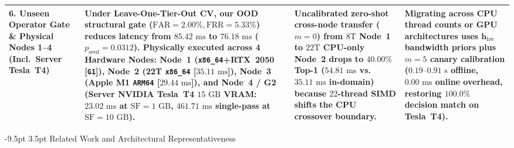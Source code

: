 \documentclass[10pt,a4paper]{article}
\makeatletter
\newenvironment{fitasttable}{%
  \begin{lrbox}{\asttblbox}%
}{%
  \end{lrbox}%
  \sbox{\asttblboxB}{%
    \ifdim\wd\asttblbox>0.96\textwidth
      \resizebox{0.96\textwidth}{!}{\usebox{\asttblbox}}%
    \else
      \usebox{\asttblbox}%
    \fi
  }%
  \ifdim\ht\asttblboxB>0.72\textheight
    \resizebox{!}{0.72\textheight}{\usebox{\asttblboxB}}%
  \else
    \usebox{\asttblboxB}%
  \fi
}
\renewcommand\section{\@startsection{section}{1}{\z@}%
  {-9.5pt \@plus -2pt \@minus -1.5pt}%
  {3.5pt \@plus 1pt}%
  {\normalfont\large\bfseries}}
\makeatother
\begin{document}
\begin{table}[!htbp]
{\begin{fitasttable}
\begin{tabular}{@{}p{2.6cm}p{4.6cm}p{4.3cm}p{4.5cm}@{}}
\textbf{6. Unseen Operator Gate \& Physical Nodes 1--4 (Incl.\ Server Tesla~T4)} & Under Leave-One-Tier-Out CV, our OOD structural gate ($\text{FAR}=2.00\%, \text{FRR}=5.33\%$) reduces latency from $85.42\text{ ms}$ to $76.18\text{ ms}$ ($p_{\text{seed}}=0.0312$). Physically executed across \textbf{4 Hardware Nodes}: Node~1 (\texttt{x86\_64}+RTX~2050 [\texttt{G1}]), Node~2 (22T \texttt{x86\_64} [$35.11\text{ ms}$]), Node~3 (Apple M1 \texttt{ARM64} [$29.44\text{ ms}$]), and \textbf{Node~4 / G2 (Server NVIDIA Tesla~T4 $15\text{ GB}$ VRAM: $23.02\text{ ms}$ at $\text{SF}=1\text{ GB}$, $461.71\text{ ms}$ single-pass at $\text{SF}=10\text{ GB}$)}. & Uncalibrated zero-shot cross-node transfer ($m=0$) from $8\text{T}$ Node~1 to $22\text{T}$ CPU-only Node~2 drops to $40.00\%$ Top-1 ($54.81\text{ ms}$ vs.\ $35.11\text{ ms}$ in-domain) because $22$-thread SIMD shifts the CPU crossover boundary. & Migrating across CPU thread counts or GPU architectures uses $\mathbf{h}_{\text{hw}}$ bandwidth priors plus $m=5$ canary calibration ($0.19\text{--}0.91\text{ s}$ offline, $0.00\text{ ms}$ online overhead, restoring $100.0\%$ decision match on Tesla~T4). \\
\bottomrule
\end{tabular}
\end{fitasttable}
}
\end{table}

\section{Related Work and Architectural Representativeness}
\end{document}
